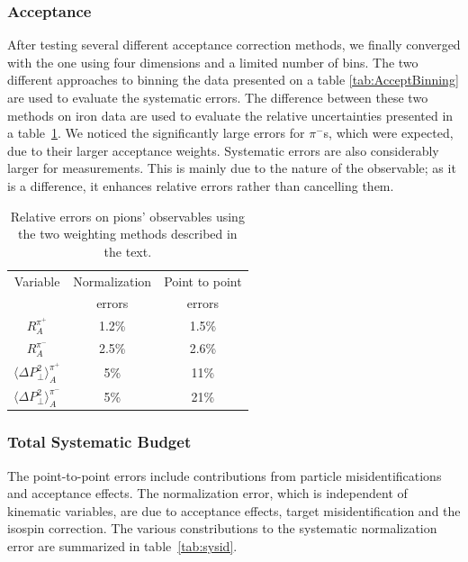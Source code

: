 \subsubsection{Acceptance}

After testing several different acceptance correction methods, we finally 
converged with the one using four dimensions and a limited number of bins.
The two different approaches to binning the data presented on a table 
\ref{tab:AcceptBinning} are used to evaluate the systematic errors. The 
difference between these two methods on iron data are used to evaluate 
the relative uncertainties presented in a table~\ref{tab:SysAcc}. We noticed 
the significantly large errors for $\pi^-$s, which were expected, due to their 
larger acceptance weights. Systematic errors are also
considerably larger for \dpt measurements. This is mainly due to the nature of 
the \dpt observable; as it is a difference, it enhances relative errors 
rather than cancelling them. 

\begin{table}[htbp]
  \centering
\renewcommand{\arraystretch}{1.3}
  \begin{tabular}{|c|c|c|}
    \hline
    Variable & Normalization & Point to point \\ 
             & errors        & errors         \\ 
    \hline
    $R^{\pi^+}_A$  & 1.2\% & 1.5\%  \\
    $R^{\pi^-}_A$  & 2.5\% & 2.6\%   \\
    $\langle \Delta P_\perp^2 \rangle^{\pi^+}_A$ & 5\% & 11\% \\
    $\langle \Delta P_\perp^2 \rangle^{\pi^-}_A$ & 5\% & 21\% \\
    \hline
  \end{tabular}
  \caption{Relative errors on pions' observables using the two weighting 
           methods described in the text.}
  \label{tab:SysAcc}
\end{table}

\subsubsection{Total Systematic Budget}

The point-to-point errors include contributions from particle 
misidentifications and acceptance effects. The normalization error, which is 
independent of kinematic variables, are due to acceptance effects, target 
misidentification and the isospin correction. The various constributions 
to the systematic normalization error are summarized in table~\ref{tab:sysid}. 

